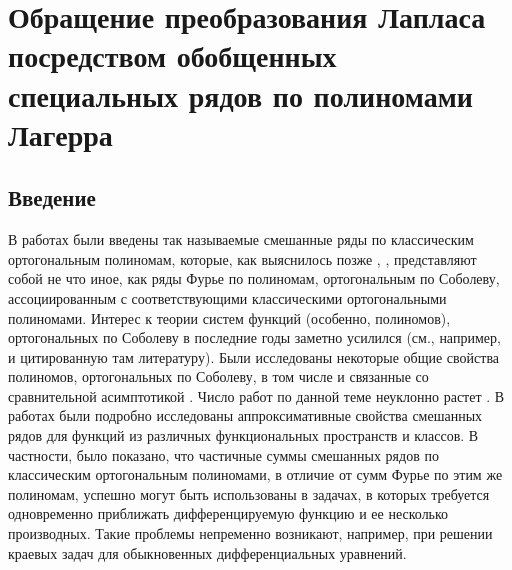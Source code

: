 \chapter{Обращение преобразования Лапласа посредством обобщенных специальных рядов по  полиномами Лагерра}\label{sect-laplas}













\section{Введение}
В работах \cite{laplas-Shar13, laplas-Shar14, sobleg-Shar15, sobleg-Shar16}  были введены так называемые смешанные ряды по классическим ортогональным полиномам, которые, как выяснилось позже \cite{laplas-Shar11}, \cite{sobleg-SHII}, представляют собой не что иное, как ряды Фурье по полиномам, ортогональным по Соболеву, ассоциированным с соответствующими классическими ортогональными  полиномами.
Интерес к теории систем   функций (особенно, полиномов), ортогональных по Соболеву в последние годы заметно усилился (см., например, \cite{sobleg-KwonLittl1, sobleg-KwonLittl2, sobleg-MarcelAlfaroRezola, sobleg-IserKoch, laplas-Meijer, laplas-MarcelXu} и цитированную там литературу). Были исследованы некоторые общие свойства полиномов, ортогональных по Соболеву, в том числе и связанные со сравнительной асимптотикой \cite{laplas-MarcelVanash}. Число работ по данной теме  неуклонно растет  \cite{laplas-MarcelXu}. В работах \cite{laplas-Shar13, laplas-Shar14, sobleg-Shar15, sobleg-Shar16, laplas-Shar11, sobleg-SHII} были подробно исследованы аппроксимативные свойства смешанных рядов для функций из различных функциональных пространств и классов. В частности, было показано, что частичные суммы смешанных рядов по классическим ортогональным полиномами, в отличие от сумм Фурье по этим же полиномам, успешно могут быть использованы в задачах, в которых требуется одновременно приближать дифференцируемую функцию и ее несколько производных. Такие проблемы непременно возникают, например, при решении краевых задач для обыкновенных дифференциальных уравнений.

